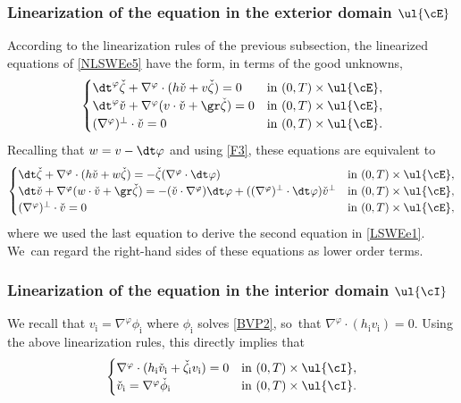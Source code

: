 \subsubsection{Linearization of the equation in the exterior domain $\ul{\cE}$}
According to the linearization rules of the previous subsection, the linearized equations of \eqref{NLSWEe5} have the form, in terms of the good unknowns,
\[\begin{cases}
\dt^\varphi\check{\zeta}+\nabla^\varphi\cdot(h\check{v}+v\check{\zeta}) = 0 &\text{in } (0,T)\times\ul{\cE}, \\
\dt^\varphi\check{v}+\nabla^\varphi(v\cdot\check{v}+\gr\check{\zeta}) = 0 &\text{in } (0,T)\times\ul{\cE}, \\
(\nabla^\varphi)^\perp\cdot\check{v} = 0 &\text{in } (0,T)\times\ul{\cE}.
\end{cases}
\]
Recalling that $w=v-\dt\varphi$ and using \eqref{F3}, these equations are equivalent to
\begin{equation}\label{LSWEe1}
\begin{cases}
\dt\check{\zeta}+\nabla^\varphi\cdot(h\check{v}+w\check{\zeta}) = -\check{\zeta}(\nabla^\varphi\cdot\dt\varphi) &\text{in } (0,T)\times\ul{\cE}, \\
\dt\check{v}+\nabla^\varphi(w\cdot\check{v}+\gr\check{\zeta}) = -(\check{v}\cdot\nabla^\varphi)\dt\varphi+((\nabla^\varphi)^\perp\cdot\dt\varphi)\check{v}^\perp
&\text{in } (0,T)\times\ul{\cE}, \\
(\nabla^\varphi)^\perp\cdot\check{v} = 0 &\text{in } (0,T)\times\ul{\cE},
\end{cases}
\end{equation}
where we used the last equation to derive the second equation in \eqref{LSWEe1}. We~can regard the right-hand sides of these equations as lower order terms.

\subsubsection{Linearization of the equation in the interior domain $\ul{\cI}$}
We recall that $v_\mathrm{i}=\nabla^\varphi\phi_\mathrm{i}$ where $\phi_\mathrm{i}$ solves \eqref{BVP2}, so~that $\nabla^\varphi\cdot(h_\mathrm{i}v_\mathrm{i})=0$.
Using the above linearization rules, this directly implies that
\begin{equation}\label{LSWEi1}
\begin{cases}
\nabla^\varphi\cdot(h_\mathrm{i}\check{v}_\mathrm{i}+\check{\zeta}_\mathrm{i} v_\mathrm{i}) = 0 &\text{in } (0,T)\times\ul{\cI}, \\
\check{v}_\mathrm{i}=\nabla^\varphi\check{\phi}_\mathrm{i} &\text{in } (0,T)\times\ul{\cI}.
\end{cases}
\end{equation}

